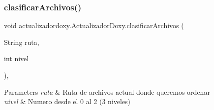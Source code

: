 \subsubsection{\texorpdfstring{clasificar\+Archivos()}{clasificarArchivos()}}
{\footnotesize\ttfamily void actualizadordoxy.\+Actualizador\+Doxy.\+clasificar\+Archivos (\begin{DoxyParamCaption}\item[{String}]{ruta,  }\item[{int}]{nivel }\end{DoxyParamCaption})\hspace{0.3cm}{\ttfamily [inline]}, {\ttfamily [private]}}


\begin{DoxyParams}{Parameters}
{\em ruta} & Ruta de archivos actual donde queremos ordenar \\
\hline
{\em nivel} & Numero desde el 0 al 2 (3 niveles) \\
\hline
\end{DoxyParams}

